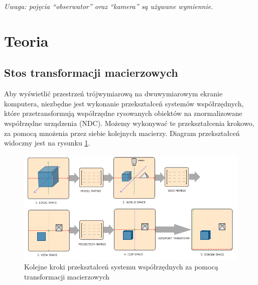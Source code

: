 \documentclass[a4paper]{article}
\begin{document}
\textit{Uwaga: pojęcia ``obserwator'' oraz ``kamera'' są używane wymiennie.}

\section{Teoria}
\subsection{Stos transformacji macierzowych}

Aby wyświetlić przestrzeń trójwymiarową na dwuwymiarowym ekranie komputera,
niezbędne jest wykonanie przekształceń systemów współrzędnych, które
przetransformują współrzędne rysowanych obiektów na znormalizowane współrzędne
urządzenia (NDC). Możemy wykonywać te przekształcenia krokowo, za pomocą
mnożenia przez siebie kolejnych macierzy. Diagram przekształceń widoczny jest na
rysunku \ref{fig:coordinates}.

\begin{figure}[H]
    \centering
    \includegraphics[width=\textwidth]{coordinate_systems}
    \caption{Kolejne kroki przekształceń systemu współrzędnych za pomocą transformacji macierzowych}
    \label{fig:coordinates}
\end{figure}
\end{document}
